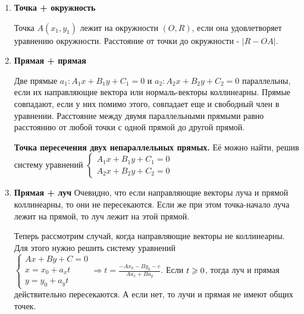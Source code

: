 \begin{enumerate}
    \textbf{Расстояние от точки до отрезка.} Если проекция точки $C$ лежит на отрезке(т. е. углы в треугольнике острые: $\Rightarrow (\Vec{AC}, \Vec{AB}) \cdot (\Vec{BC}, \Vec{BA}) > 0$), тогда расстояние можно найти как расстояние до прямой, содержащей отрезок, а иначе - нужно взять минимум из расстояний до концов отрезка. Итого, $\rho(C, AB) = \begin{cases}
        \rho(C, l(AB)), & pr_{AB}C \in AB \\
        min(|CA|, |CB|), & \textit{иначе}
    \end{cases}$

    \item \textbf{Точка + окружность} 
    
    Точка $A(x_1, y_1)$ лежит на окружности $(O, R)$, если она удовлетворяет уравнению окружности. Расстояние от точки до окружности - $|R - OA|$.
    \item \textbf{Прямая + прямая} 

    Две прямые $a_1:A_1x+B_1y+C_1=0$ и $a_2:A_2x+B_2y+C_2=0$ параллельны, если их направляющие вектора или нормаль-векторы коллинеарны. Прямые совпадают, если у них помимо этого, совпадает еще и свободный член в уравнении. Расстояние между двумя параллельными прямыми равно расстоянию от любой точки с одной прямой до другой прямой.

    \textbf{Точка пересечения двух непараллельных прямых.} Её можно найти, решив систему уравнений $\begin{cases}
        A_1x+B_1y+C_1=0\\
        A_2x+B_2y+C_2=0
    \end{cases}$
    
    \item \textbf{Прямая + луч} Очевидно, что если направляющие векторы луча и прямой коллинеарны, то они не пересекаются. Если же при этом точка-начало луча лежит на прямой, то луч лежит на этой прямой.

    Теперь рассмотрим случай, когда направляющие векторы не коллинеарны. Для этого нужно решить систему уравнений $\begin{cases}
        Ax+By+C=0\\
        x = x_0 + a_xt\\
        y = y_0 + a_yt
    \end{cases} \Rightarrow t = \displaystyle\frac{-Ax_0-By_0-c}{Aa_x + Ba_y}$. Если $t \geqslant 0$, тогда луч и прямая действительно пересекаются. А если нет, то лучи и прямая не имеют общих точек.


\end{enumerate}
